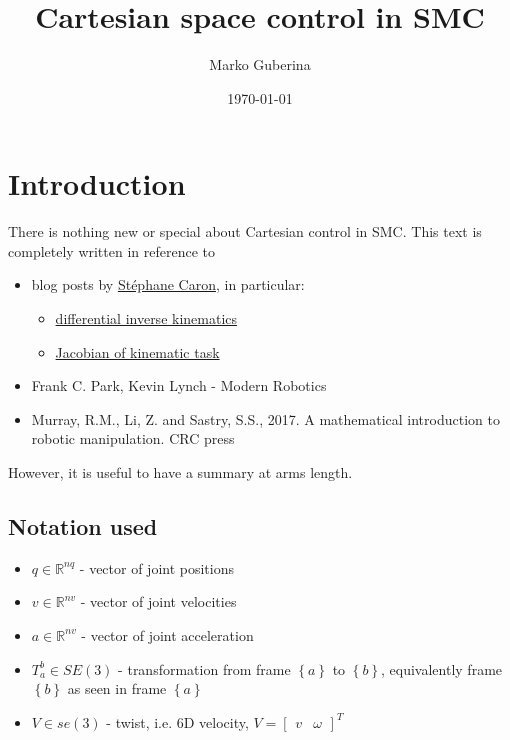 \documentclass{article}
\title{Cartesian space control in SMC}
\date{\today}
\author{Marko Guberina}
\begin{document}
\maketitle

\section{Introduction}
There is nothing new or special about Cartesian control in SMC.
This text is completely written in reference to
\begin{itemize}
		\item blog posts by  \href{https://scaron.info/category/robotics.html}{Stéphane Caron}, in particular:
				\begin{itemize}
						\item \href{https://scaron.info/robotics/differential-inverse-kinematics.html}{differential inverse kinematics} 
						\item \href{https://scaron.info/robotics/jacobian-of-a-kinematic-task-and-derivatives-on-manifolds.html}{Jacobian of kinematic task}
				\end{itemize}
		\item Frank C. Park, Kevin Lynch - Modern Robotics
		\item Murray, R.M., Li, Z. and Sastry, S.S., 2017. A mathematical introduction to robotic manipulation. CRC press
\end{itemize}

However, it is useful to have a summary at arms length.

\subsection{Notation used}
\begin{itemize}
		\item $ q \in \mathbb{R}^{nq}  $ - vector of joint positions
		\item $ v \in \mathbb{R}^{nv} $ - vector of joint velocities
		\item $ a\in \mathbb{R}^{nv}  $ - vector of joint acceleration
		\item $ T_{ a }^{ b } \in SE (3) $ - transformation from frame $\left\{ a \right\} $
				to $ \left\{ b \right\}   $, equivalently frame $ \left\{ b \right\}   $
				as seen in frame $ \left\{ a \right\}   $
		\item $ V \in se (3) $ - twist, i.e. 6D velocity, 
				$ V = \begin{bmatrix} v & \omega \end{bmatrix} ^{ T }  $
\end{itemize}
\end{document}
